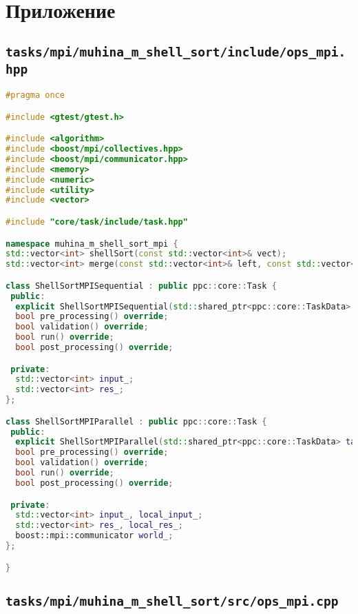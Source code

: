 \documentclass[12pt]{article}
\begin{document}
\appendix
\section*{Приложение}
\subsection*{\texttt{tasks/mpi/muhina\_m\_shell\_sort/include/ops\_mpi.hpp}}

\begin{lstlisting}[language=C++]
#pragma once

#include <gtest/gtest.h>

#include <algorithm>
#include <boost/mpi/collectives.hpp>
#include <boost/mpi/communicator.hpp>
#include <memory>
#include <numeric>
#include <utility>
#include <vector>

#include "core/task/include/task.hpp"

namespace muhina_m_shell_sort_mpi {
std::vector<int> shellSort(const std::vector<int>& vect);
std::vector<int> merge(const std::vector<int>& left, const std::vector<int>& right);

class ShellSortMPISequential : public ppc::core::Task {
 public:
  explicit ShellSortMPISequential(std::shared_ptr<ppc::core::TaskData> taskData_) : Task(std::move(taskData_)) {}
  bool pre_processing() override;
  bool validation() override;
  bool run() override;
  bool post_processing() override;

 private:
  std::vector<int> input_;
  std::vector<int> res_;
};

class ShellSortMPIParallel : public ppc::core::Task {
 public:
  explicit ShellSortMPIParallel(std::shared_ptr<ppc::core::TaskData> taskData_) : Task(std::move(taskData_)) {}
  bool pre_processing() override;
  bool validation() override;
  bool run() override;
  bool post_processing() override;

 private:
  std::vector<int> input_, local_input_;
  std::vector<int> res_, local_res_;
  boost::mpi::communicator world_;
};

}  

\end{lstlisting}

\subsection*{\texttt{tasks/mpi/muhina\_m\_shell\_sort/src/ops\_mpi.cpp}}
\end{document}
